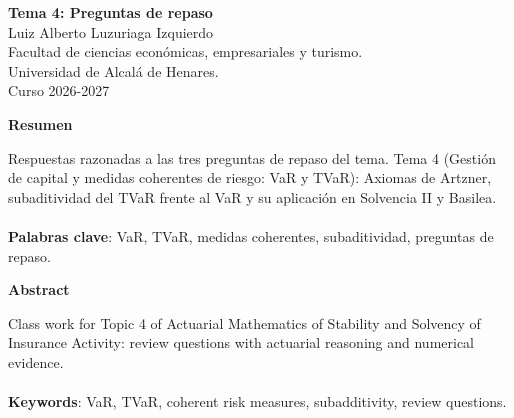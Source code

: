 \documentclass[a4paper,12pt]{article}
\begin{document}
\begin{titlepage}
    \centering
    \vspace*{0.1cm}
    \huge\textbf{Tema 4: Preguntas de repaso}\\
    \vspace{1cm}
    \small{Luiz Alberto Luzuriaga Izquierdo}\\
    \vspace{0.1cm}
    Facultad de ciencias económicas, empresariales y turismo. \\
    \vspace{0.1cm}
    Universidad de Alcalá de Henares. \\
    \vspace{0.1cm}
    Curso 2026-2027\\
    \vspace{0.5cm}

{\bfseries Resumen}

\vspace{0.1cm}
\noindent
\begin{justify}
Respuestas razonadas a las tres preguntas de repaso del tema. Tema 4 (Gestión de capital y medidas coherentes de riesgo: VaR y TVaR): Axiomas de Artzner, subaditividad del TVaR frente al VaR y su aplicación en Solvencia II y Basilea.\\\\
\vspace{0.1cm}
\noindent
\textbf{Palabras clave}: VaR, TVaR, medidas coherentes, subaditividad, preguntas de repaso.
\end{justify}
\begin{center}
    {\bfseries Abstract}
\end{center}
\vspace{0.1cm}
\noindent
\begin{justify}
Class work for Topic 4 of Actuarial Mathematics of Stability and Solvency of Insurance Activity: review questions with actuarial reasoning and numerical evidence.\\\\
\vspace{0.1cm}
\noindent
\textbf{Keywords}: VaR, TVaR, coherent risk measures, subadditivity, review questions.
\end{justify}

\end{titlepage}

\newpage{}
\renewcommand{\contentsname}{Índice}
\tableofcontents
\end{document}
